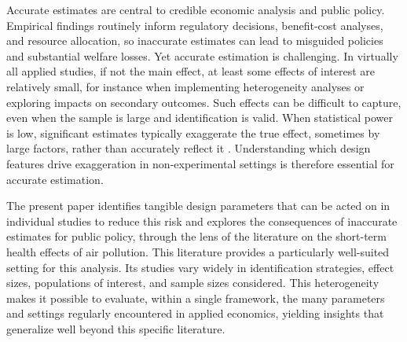 \documentclass[12pt]{article}
\begin{document}
\onehalfspacing




	
		\noindent Accurate estimates are central to credible economic analysis and public policy. Empirical findings routinely inform regulatory decisions, benefit-cost analyses, and resource allocation, so inaccurate estimates can lead to misguided policies and substantial welfare losses. Yet accurate estimation is challenging. In virtually all applied studies, if not the main effect, at least some effects of interest are relatively small, for instance when implementing heterogeneity analyses or exploring impacts on secondary outcomes. Such effects can be difficult to capture, even when the sample is large and identification is valid. When statistical power is low, significant estimates typically exaggerate the true effect, sometimes by large factors, rather than accurately reflect it \citep{gelman_type_2000}. Understanding which design features drive exaggeration in non-experimental settings is therefore essential for accurate estimation.
		
		The present paper identifies tangible design parameters that can be acted on in individual studies to reduce this risk and explores the consequences of inaccurate estimates for public policy, through the lens of the literature on the short-term health effects of air pollution. This literature provides a particularly well-suited setting for this analysis. Its studies vary widely in identification strategies, effect sizes, populations of interest, and sample sizes considered. This heterogeneity makes it possible to evaluate, within a single framework, the many parameters and settings regularly encountered in applied economics, yielding insights that generalize well beyond this specific literature.
		
\end{document}

